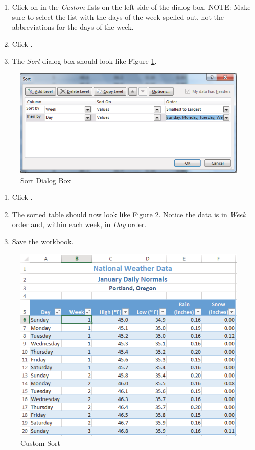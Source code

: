 \begin{enumerate}[resume]
	\item Click on  in the \textit{Custom} lists on the left-side of the dialog box. NOTE: Make sure to select the list with the days of the week spelled out, not the abbreviations for the days of the week.
	\item Click . 
	\item The \textit{Sort} dialog box should look like Figure \ref{05:fig14}.
\end{enumerate}

\begin{figure}[H]
	\centering
	\includegraphics[width=\maxwidth{.95\linewidth}]{gfx/ch05_fig14}
	\caption{Sort Dialog Box}
	\label{05:fig14}
\end{figure}

\begin{enumerate}
	\item Click .
	\item The sorted table should now look like Figure \ref{05:fig15}. Notice the data is in \textit{Week} order and, within each week, in \textit{Day} order.
	\item Save the  workbook.
\end{enumerate}

\begin{figure}[H]
	\centering
	\includegraphics[width=\maxwidth{.95\linewidth}]{gfx/ch05_fig15}
	\caption{Custom Sort}
	\label{05:fig15}
\end{figure}

